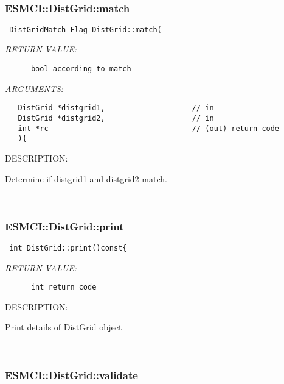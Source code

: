  
\mbox{}\hrulefill\
 
\subsubsection [ESMCI::DistGrid::match] {ESMCI::DistGrid::match}


  
\begin{verbatim} DistGridMatch_Flag DistGrid::match(\end{verbatim}{\em RETURN VALUE:}
\begin{verbatim}      bool according to match\end{verbatim}{\em ARGUMENTS:}
\begin{verbatim}   DistGrid *distgrid1,                    // in
   DistGrid *distgrid2,                    // in
   int *rc                                 // (out) return code
   ){\end{verbatim}
{\sf DESCRIPTION:\\ }


      Determine if distgrid1 and distgrid2 match.
   
 
\mbox{}\hrulefill\
 
\subsubsection [ESMCI::DistGrid::print] {ESMCI::DistGrid::print}


  
\begin{verbatim} int DistGrid::print()const{\end{verbatim}{\em RETURN VALUE:}
\begin{verbatim}      int return code\end{verbatim}
{\sf DESCRIPTION:\\ }


      Print details of DistGrid object 
   
 
\mbox{}\hrulefill\
 
\subsubsection [ESMCI::DistGrid::validate] {ESMCI::DistGrid::validate}


